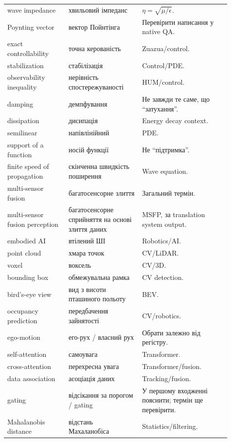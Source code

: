 \begin{longtable}{L{0.25\linewidth}L{0.30\linewidth}L{0.36\linewidth}}
wave impedance & хвильовий імпеданс & $\eta=\sqrt{\mu/\epsilon}$.\\
Poynting vector & вектор Пойнтінга & Перевірити написання у native QA.\\
exact controllability & точна керованість & Zuazua/control.\\
stabilization & стабілізація & Control/PDE.\\
observability inequality & нерівність спостережуваності & HUM/control.\\
damping & демпфування & Не завжди те саме, що ``затухання''.\\
dissipation & дисипація & Energy decay context.\\
semilinear & напівлінійний & PDE.\\
support of a function & носій функції & Не ``підтримка''.\\
finite speed of propagation & скінченна швидкість поширення & Wave equation.\\
multi-sensor fusion & багатосенсорне злиття & Загальний термін.\\
multi-sensor fusion perception & багатосенсорне сприйняття на основі злиття даних & MSFP, за translation system output.\\
embodied AI & втілений ШІ & Robotics/AI.\\
point cloud & хмара точок & CV/LiDAR.\\
voxel & воксель & CV/3D.\\
bounding box & обмежувальна рамка & CV detection.\\
bird's-eye view & вид з висоти пташиного польоту & BEV.\\
occupancy prediction & передбачення зайнятості & CV/robotics.\\
ego-motion & его-рух / власний рух & Обрати залежно від регістру.\\
self-attention & самоувага & Transformer.\\
cross-attention & перехресна увага & Transformer/fusion.\\
data association & асоціація даних & Tracking/fusion.\\
gating & відсікання за порогом / gating & У першому входженні пояснити; термін ще перевірити.\\
Mahalanobis distance & відстань Махаланобіса & Statistics/filtering.\\
\bottomrule
\end{longtable}
